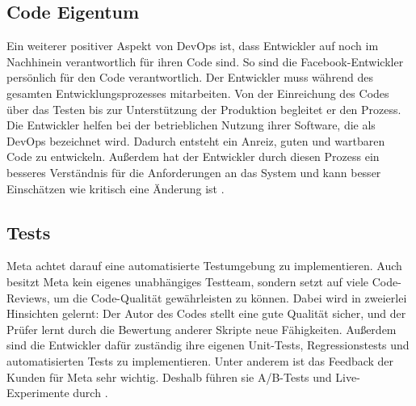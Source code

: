 \subsection{Code Eigentum}
Ein weiterer positiver Aspekt von DevOps ist, dass Entwickler auf noch im Nachhinein verantwortlich für ihren Code sind. So sind die Facebook-Entwickler persönlich für den Code verantwortlich. Der Entwickler muss während des gesamten Entwicklungsprozesses mitarbeiten. Von der Einreichung des Codes über das Testen bis zur Unterstützung der Produktion begleitet er den Prozess. Die Entwickler helfen bei der betrieblichen Nutzung ihrer Software, die als DevOps bezeichnet wird. Dadurch entsteht ein Anreiz, guten und wartbaren Code zu entwickeln. Außerdem hat der Entwickler durch diesen Prozess ein besseres Verständnis für die Anforderungen an das System und kann besser Einschätzen wie kritisch eine Änderung ist \cite{jameslee}.

\subsection{Tests}
Meta achtet darauf eine automatisierte Testumgebung zu implementieren. Auch besitzt Meta kein eigenes unabhängiges Testteam, sondern setzt auf viele Code-Reviews, um die Code-Qualität gewährleisten zu können. Dabei wird in zweierlei Hinsichten gelernt: Der Autor des Codes stellt eine gute Qualität sicher, und der Prüfer lernt durch die Bewertung anderer Skripte neue Fähigkeiten. Außerdem sind die Entwickler dafür zuständig ihre eigenen Unit-Tests, Regressionstests und automatisierten Tests zu implementieren. Unter anderem ist das Feedback der Kunden für Meta sehr wichtig. Deshalb führen sie A/B-Tests und Live-Experimente durch \cite{jameslee}.
